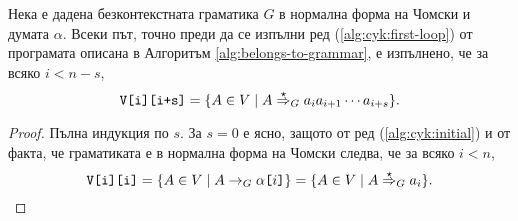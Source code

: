 \begin{lemma}
  Нека е дадена безконтекстната граматика $G$ в нормална форма на Чомски и думата $\alpha$.
  Всеки път, точно преди да се изпълни ред (\ref{alg:cyk:first-loop}) от програмата описана в Алгоритъм \ref{alg:belongs-to-grammar},
  е изпълнено, че за всяко $i < n-s$,
  \[\texttt{V[i][i+s]} = \{A \in V \mid A \stackrel{{\star}}{\Rightarrow}_G a_ia_{i+1}\cdots a_{i+s}\}.\]
\end{lemma}
\begin{proof}
  Пълна индукция по $s$.
  За $s = 0$ е ясно, защото от ред (\ref{alg:cyk:initial}) и от факта, че граматиката е в нормална форма на Чомски следва, че за всяко $i < n$, 
  \[\texttt{V[i][i]} = \{A \in V \mid A \to_G \alpha\texttt{[}{i}\texttt{]}\} = \{A \in V \mid A \stackrel{{\star}}{\Rightarrow}_G a_i\}.\]
  

\end{proof}
